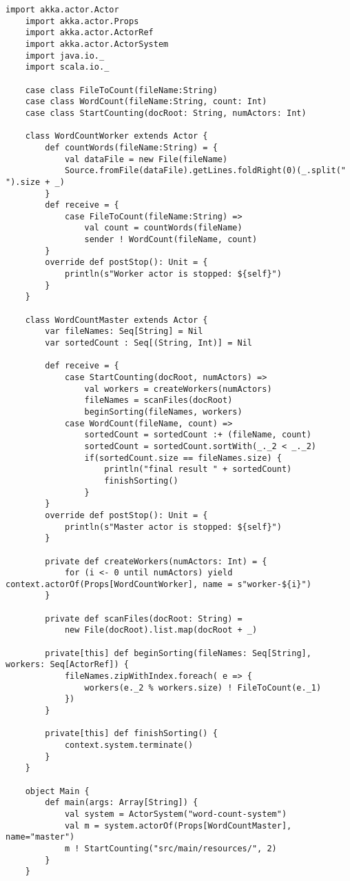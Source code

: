 \documentclass[12pt]{article}
\begin{document}
	\begin{lstlisting}[style=myScalastyle, caption={Actor wordcount}, label={wordcount}]
	import akka.actor.Actor
	import akka.actor.Props
	import akka.actor.ActorRef
	import akka.actor.ActorSystem
	import java.io._
	import scala.io._

	case class FileToCount(fileName:String)
	case class WordCount(fileName:String, count: Int)
	case class StartCounting(docRoot: String, numActors: Int)

	class WordCountWorker extends Actor {
		def countWords(fileName:String) = {
			val dataFile = new File(fileName)
			Source.fromFile(dataFile).getLines.foldRight(0)(_.split(" ").size + _)
		}
		def receive = {
			case FileToCount(fileName:String) =>
				val count = countWords(fileName)
				sender ! WordCount(fileName, count)
		}
		override def postStop(): Unit = {
			println(s"Worker actor is stopped: ${self}")
		}
	}

	class WordCountMaster extends Actor {
		var fileNames: Seq[String] = Nil
		var sortedCount : Seq[(String, Int)] = Nil

		def receive = {
			case StartCounting(docRoot, numActors) =>
				val workers = createWorkers(numActors)
				fileNames = scanFiles(docRoot)
				beginSorting(fileNames, workers)
			case WordCount(fileName, count) =>
				sortedCount = sortedCount :+ (fileName, count)
				sortedCount = sortedCount.sortWith(_._2 < _._2)
				if(sortedCount.size == fileNames.size) {
					println("final result " + sortedCount)
					finishSorting()
				}
		}
		override def postStop(): Unit = {
			println(s"Master actor is stopped: ${self}")
		}
		
		private def createWorkers(numActors: Int) = {
			for (i <- 0 until numActors) yield context.actorOf(Props[WordCountWorker], name = s"worker-${i}")
		}
		
		private def scanFiles(docRoot: String) =
			new File(docRoot).list.map(docRoot + _)
		
		private[this] def beginSorting(fileNames: Seq[String], workers: Seq[ActorRef]) {
			fileNames.zipWithIndex.foreach( e => {
				workers(e._2 % workers.size) ! FileToCount(e._1)
			})
		}

		private[this] def finishSorting() {
			context.system.terminate()
		}
	}

	object Main {
		def main(args: Array[String]) {
			val system = ActorSystem("word-count-system")
			val m = system.actorOf(Props[WordCountMaster], name="master")
			m ! StartCounting("src/main/resources/", 2)
		}
	}

	\end{lstlisting}
\end{document}
